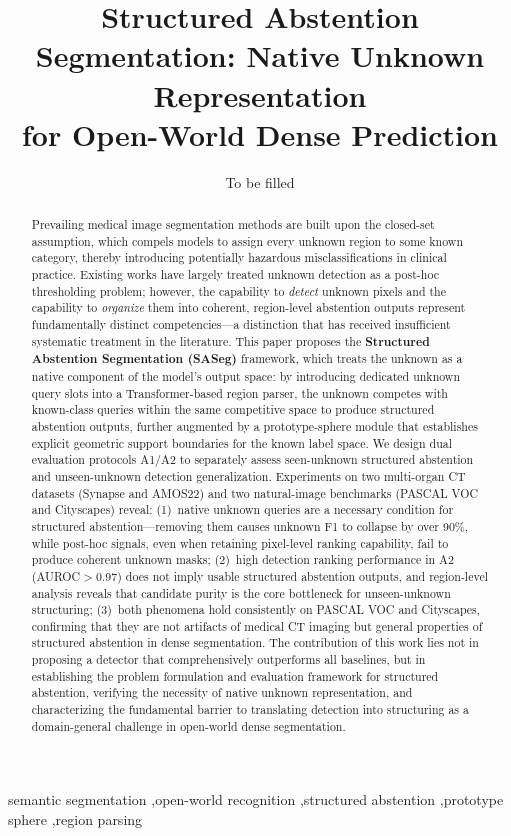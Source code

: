 \documentclass[3p,twocolumn,authoryear]{elsarticle}
\begin{document}
\begin{frontmatter}
\title{Structured Abstention Segmentation: Native Unknown Representation\\for Open-World Dense Prediction}

\author[addr1]{To be filled}
\address[addr1]{To be filled}

\begin{abstract}
Prevailing medical image segmentation methods are built upon the closed-set assumption,
which compels models to assign every unknown region to some known category,
thereby introducing potentially hazardous misclassifications in clinical practice.
Existing works have largely treated unknown detection as a post-hoc thresholding problem;
however, the capability to \emph{detect} unknown pixels and the capability to
\emph{organize} them into coherent, region-level abstention outputs represent
fundamentally distinct competencies---a distinction that has received insufficient
systematic treatment in the literature.
This paper proposes the \textbf{Structured Abstention Segmentation (SASeg)} framework,
which treats the unknown as a native component of the model's output space:
by introducing dedicated unknown query slots into a Transformer-based region parser,
the unknown competes with known-class queries within the same competitive space to
produce structured abstention outputs, further augmented by a prototype-sphere module
that establishes explicit geometric support boundaries for the known label space.
We design dual evaluation protocols A1/A2 to separately assess
seen-unknown structured abstention and unseen-unknown detection generalization.
Experiments on two multi-organ CT datasets (Synapse and AMOS22) and two natural-image
benchmarks (PASCAL VOC and Cityscapes) reveal:
(1)~native unknown queries are a necessary condition for structured abstention---removing
    them causes unknown F1 to collapse by over 90\%, while post-hoc signals, even when
    retaining pixel-level ranking capability, fail to produce coherent unknown masks;
(2)~high detection ranking performance in A2 (AUROC$>$0.97) does not imply usable
    structured abstention outputs, and region-level analysis reveals that candidate purity
    is the core bottleneck for unseen-unknown structuring;
(3)~both phenomena hold consistently on PASCAL VOC and Cityscapes, confirming that they
    are not artifacts of medical CT imaging but general properties of structured abstention
    in dense segmentation.
The contribution of this work lies not in proposing a detector that comprehensively
outperforms all baselines, but in establishing the problem formulation and evaluation
framework for structured abstention, verifying the necessity of native unknown
representation, and characterizing the fundamental barrier to translating detection
into structuring as a domain-general challenge in open-world dense segmentation.
\end{abstract}

\begin{keyword}
semantic segmentation \sep open-world recognition \sep structured abstention \sep prototype sphere \sep region parsing
\end{keyword}
\end{frontmatter}
\end{document}
